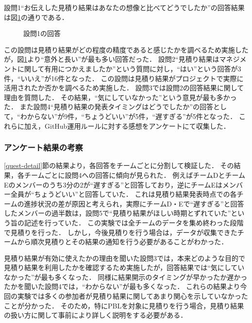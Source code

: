 \documentclass{compsoft}
\begin{document}
設問1``お伝えした見積り結果はあなたの想像と比べてどうでしたか''の回答結果は図\ref{fig:q1}の通りである．
\begin{figure}[tb]
\begin{center}
\end{center}
\caption{設問1の回答}
\label{fig:q1}
\end{figure}
この設問は見積り結果がどの程度の精度であると感じたかを調べるため実施したが，図\ref{fig:q1}より``意外と長い''が最も多い回答だった．
設問2``見積り結果はマネジメントに関して有用につかえましたか''という質問に対し，``はい''という回答が3件，``いいえ''が16件となった．
この設問は見積り結果がプロジェクトで実際に活用されたか否かを調べるため実施した．
設問3では設問2の回答結果に関して理由を質問した．
その結果，``気にしていなかった''という意見が最も多かった．
また設問4``見積り結果の発表タイミングはどうでしたか''の回答として，``わからない''が9件，``ちょうどいい''が5件，``遅すぎる''が5件となった．
これらに加え，GitHub運用ルールに対する感想をアンケートにて収集した．

\subsubsection{アンケート結果の考察} \label{quest-cons}
\ref{quest-detail}節の結果より，各回答をチームごとに分割して検証した．
その結果，各チームごとに設問4への回答に傾向が見られた．
例えばチームDとチームEのメンバーのうち3分の2が``遅すぎる''と回答しており，逆にチームEはメンバー全員が``ちょうどいい''と回答していた．
これは見積り結果発表時点での各チームの進捗状況の差が原因と考えられ，実際にチームD・Eで``遅すぎる''と回答したメンバーの過半数は，設問5で``見積り結果がほしい時期とずれていた''という旨の記述を行っていた．
この実験では全チームのデータを集め終わった段階で見積りを行った．
しかし，今後見積りを行う場合は，データが収集できたチームから順次見積りとその結果の通知を行う必要があることがわかった．

見積り結果が有効に使えたかの理由を聞いた設問3では，本来どのような目的で見積り結果を利用したかを確認するため実施したが，回答結果では``気にしていなかった''が最も多くなった．
同様に結果開示のタイミングが早かったか遅かったかを聞いた設問4では，``わからない''が最も多くなった．
これらの結果より今回の実験では多くの参加者が見積り結果に関してあまり関心を示していなかったことが分かった．
そのため，特にPBLを対象に見積りを行う場合，見積り結果の扱い方に関して事前により詳しく説明をする必要がある．
\end{document}
